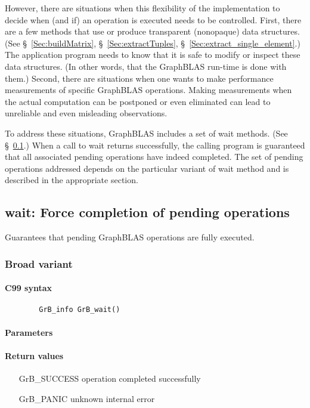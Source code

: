 However, there are situations when this flexibility of the implementation to decide when (and if) an
operation is executed needs to be controlled. First, there are a few methods that use or produce transparent
(nonopaque) data structures. (See \S~\ref{Sec:buildMatrix}, \S~\ref{Sec:extractTuples}, \S~\ref{Sec:extract_single_element}.) 
The application program needs to know that it is safe to modify or inspect
these data structures. (In other words, that the GraphBLAS run-time is done with them.)
Second, there are situations when one wants to make performance measurements of specific
GraphBLAS operations. Making measurements when the actual computation can be postponed or even 
eliminated can lead to unreliable and even misleading observations.

To address these situations, GraphBLAS includes a set of {\sf wait} methods. (See \S~\ref{Sec:wait}.)
When a call to {\sf wait} returns successfully, the calling program is guaranteed that all associated
pending operations have indeed completed. The set of pending operations addressed depends on the
particular variant of {\sf wait} method and is described in the appropriate section.

\subsection{{\sf wait}: Force completion of pending operations}
\label{Sec:wait}

Guarantees that pending GraphBLAS operations are fully executed.

\subsubsection{Broad variant}

\paragraph{C99 syntax}

\begin{verbatim}
        GrB_info GrB_wait()
\end{verbatim}

\paragraph{Parameters}

\paragraph{Return values}
\begin{itemize}[leftmargin=2.1in]
\item[{\sf GrB\_SUCCESS}]	operation completed successfully
\item[{\sf GrB\_PANIC}]		unknown internal error
\end{itemize}

